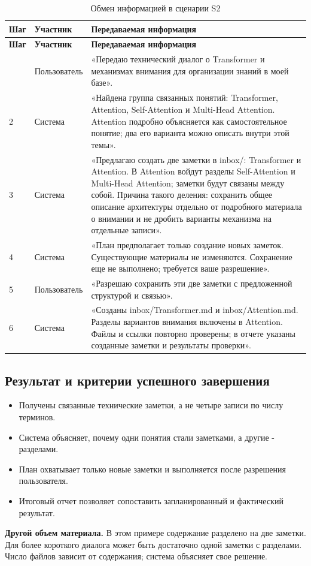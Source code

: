 {\small\setlength{\tabcolsep}{5pt}\renewcommand{\arraystretch}{1.15}
\begin{longtable}{L{9mm}L{26mm}L{\dimexpr{}\tabcolsep-35mm\relax}}
\caption{Обмен информацией в сценарии S2}\\
\toprule
\textbf{Шаг} & \textbf{Участник} & \textbf{Передаваемая информация} \\
\midrule\endfirsthead
\toprule
\textbf{Шаг} & \textbf{Участник} & \textbf{Передаваемая информация} \\
\midrule\endhead
\bottomrule{} & Пользователь & «Передаю технический диалог о Transformer и механизмах внимания для организации знаний в моей базе». \\[5pt]
2 & Система & «Найдена группа связанных понятий: Transformer, Attention, Self-Attention и Multi-Head Attention. Attention подробно объясняется как самостоятельное понятие; два его варианта можно описать внутри этой темы». \\[5pt]
3 & Система & «Предлагаю создать две заметки в inbox/: Transformer и Attention. В Attention войдут разделы Self-Attention и Multi-Head Attention; заметки будут связаны между собой. Причина такого деления: сохранить общее описание архитектуры отдельно от подробного материала о внимании и не дробить варианты механизма на отдельные записи». \\[5pt]
4 & Система & «План предполагает только создание новых заметок. Существующие материалы не изменяются. Сохранение еще не выполнено; требуется ваше разрешение». \\[5pt]
5 & Пользователь & «Разрешаю сохранить эти две заметки с предложенной структурой и связью». \\[5pt]
6 & Система & «Созданы inbox/Transformer.md и inbox/Attention.md. Разделы вариантов внимания включены в Attention. Файлы и ссылки повторно проверены; в отчете указаны созданные заметки и результаты проверки». \\[5pt]
\end{longtable}}

\subsection{Результат и критерии успешного завершения}

\begin{itemize}
\item Получены связанные технические заметки, а не четыре записи по числу терминов.
\item Система объясняет, почему одни понятия стали заметками, а другие - разделами.
\item План охватывает только новые заметки и выполняется после разрешения пользователя.
\item Итоговый отчет позволяет сопоставить запланированный и фактический результат.

\end{itemize}
\textbf{Другой объем материала.} В этом примере содержание разделено на две заметки. Для более короткого диалога может быть достаточно одной заметки с разделами. Число файлов зависит от содержания; система объясняет свое решение.


